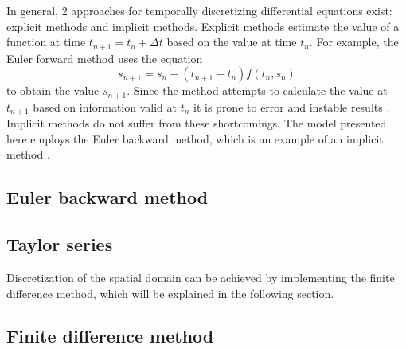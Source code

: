 In general, 2 approaches for temporally discretizing differential equations exist:  explicit methods and implicit methods.  Explicit methods estimate the value of a function at time $t_{n+1} = t_n + \Delta t$ based on the value at time $t_n$. For example, the Euler forward method uses the equation
\begin{equation}
  \label{eq:euformeth}
  s_{n+1} = s_n + (t_{n+1} - t_n) f(t_n,s_n)
\end{equation}
to obtain the value $s_{n+1}$.  Since the method attempts to calculate the value at $t_{n+1}$ based on information valid at $t_n$ it is prone to error and instable results \parencite{Weisstein2017a}.  Implicit methods do not suffer from these shortcomings.  The model presented here employs the Euler backward method, which is an example of an implicit method \parencite{Weisstein2017b}.

\subsection{Euler backward method}


\subsection{Taylor series}


Discretization of the spatial domain can be achieved by implementing the finite difference method, which will be explained in the following section.

\subsection{Finite difference method}





